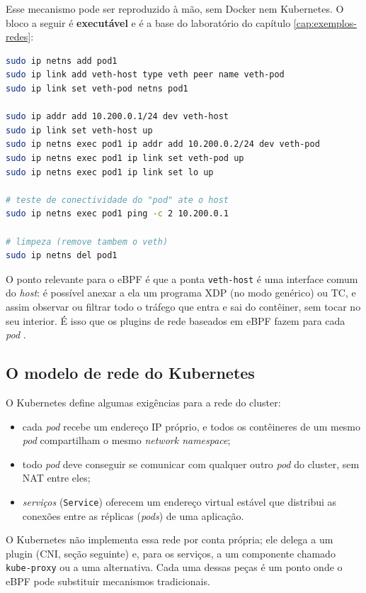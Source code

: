 Esse mecanismo pode ser reproduzido à mão, sem Docker nem Kubernetes. O bloco a seguir
é \textbf{executável} e é a base do laboratório do capítulo \ref{cap:exemplos-redes}:

\begin{lstlisting}[language=bash, caption={Emulação de um contêiner com network namespace e par veth (executável, requer root).}, label=lst:k8s-veth]
sudo ip netns add pod1
sudo ip link add veth-host type veth peer name veth-pod
sudo ip link set veth-pod netns pod1

sudo ip addr add 10.200.0.1/24 dev veth-host
sudo ip link set veth-host up
sudo ip netns exec pod1 ip addr add 10.200.0.2/24 dev veth-pod
sudo ip netns exec pod1 ip link set veth-pod up
sudo ip netns exec pod1 ip link set lo up

# teste de conectividade do "pod" ate o host
sudo ip netns exec pod1 ping -c 2 10.200.0.1

# limpeza (remove tambem o veth)
sudo ip netns del pod1
\end{lstlisting}

O ponto relevante para o eBPF é que a ponta \texttt{veth-host} é uma interface comum
do \textit{host}: é possível anexar a ela um programa XDP (no modo genérico) ou TC, e
assim observar ou filtrar todo o tráfego que entra e sai do contêiner, sem tocar
no seu interior. É isso que os plugins de rede baseados em eBPF fazem para cada \textit{pod}
\cite{ciliumdocs}.

\subsection*{O modelo de rede do Kubernetes}

O Kubernetes define algumas exigências para a rede do cluster:

\begin{itemize}
  \item cada \textit{pod} recebe um endereço IP próprio, e todos os contêineres de um
        mesmo \textit{pod} compartilham o mesmo \textit{network namespace};
  \item todo \textit{pod} deve conseguir se comunicar com qualquer outro \textit{pod}
        do cluster, sem NAT entre eles;
  \item \textit{serviços} (\texttt{Service}) oferecem um endereço virtual estável
        que distribui as conexões entre as réplicas (\textit{pods}) de uma aplicação.
\end{itemize}

O Kubernetes não implementa essa rede por conta própria; ele delega a um plugin
(CNI, seção seguinte) e, para os serviços, a um componente chamado
\texttt{kube-proxy} ou a uma alternativa. Cada uma dessas peças é um ponto onde o
eBPF pode substituir mecanismos tradicionais.

